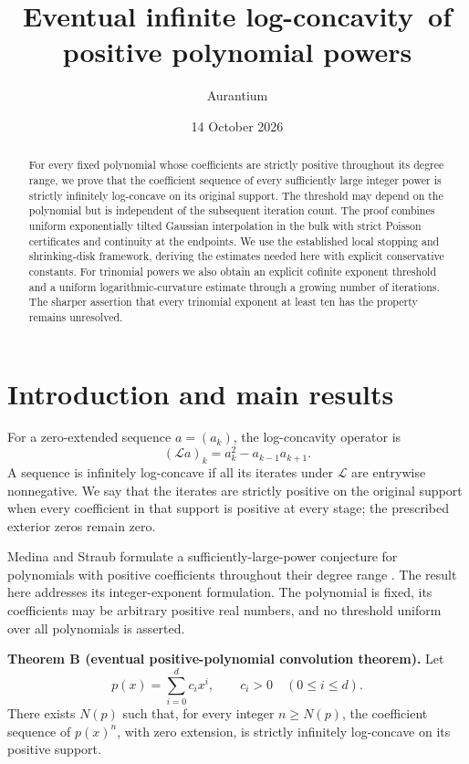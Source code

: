 \documentclass[11pt,a4paper]{article}
\title{Eventual infinite log-concavity\ of positive polynomial powers}
\author{Aurantium}
\date{14 October 2026}
\begin{document}
\maketitle
\begin{abstract}
For every fixed polynomial whose coefficients are strictly positive throughout its degree range, we prove that the coefficient sequence of every sufficiently large integer power is strictly infinitely log-concave on its original support. The threshold may depend on the polynomial but is independent of the subsequent iteration count. The proof combines uniform exponentially tilted Gaussian interpolation in the bulk with strict Poisson certificates and continuity at the endpoints. We use the established local stopping and shrinking-disk framework, deriving the estimates needed here with explicit conservative constants. For trinomial powers we also obtain an explicit cofinite exponent threshold and a uniform logarithmic-curvature estimate through a growing number of iterations. The sharper assertion that every trinomial exponent at least ten has the property remains unresolved.
\end{abstract}

\section{Introduction and main results}

For a zero-extended sequence \(a=(a_k)\), the log-concavity operator is
\[
 (\mathcal L a)_k=a_k^2-a_{k-1}a_{k+1}.
\]
A sequence is infinitely log-concave if all its iterates under \(\mathcal L\) are entrywise nonnegative. We say that the iterates are strictly positive on the original support when every coefficient in that support is positive at every stage; the prescribed exterior zeros remain zero.

Medina and Straub formulate a sufficiently-large-power conjecture for polynomials with positive coefficients throughout their degree range \cite[Conjecture~5.2]{MS}. The result here addresses its integer-exponent formulation. The polynomial is fixed, its coefficients may be arbitrary positive real numbers, and no threshold uniform over all polynomials is asserted.

\textbf{Theorem B (eventual positive-polynomial convolution theorem).}
Let \[
 p(x)=\sum_{i=0}^d c_i x^i,\qquad c_i>0\quad(0\leq i\leq d).
\] There exists \(N(p)\) such that, for every integer \(n\geq N(p)\),
the coefficient sequence of \(p(x)^n\), with zero extension, is strictly
infinitely log-concave on its positive support.
\end{document}
